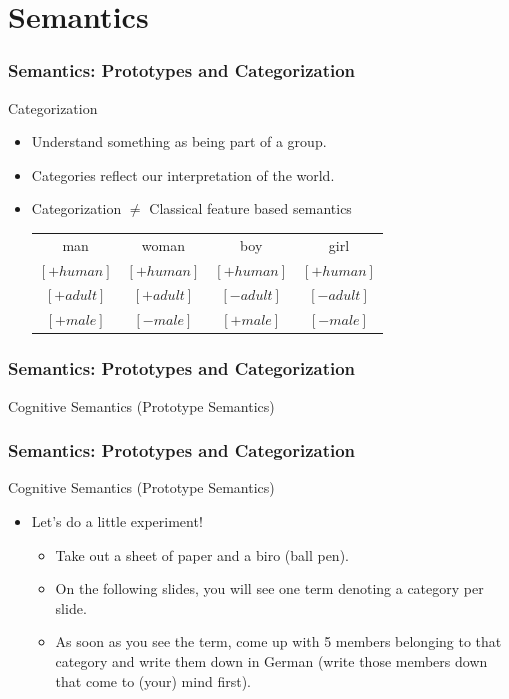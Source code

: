 \documentclass[12pt, table]{beamer}
\begin{document}
\section{Semantics}
\begin{frame}
\frametitle{Semantics: Prototypes and Categorization}
Categorization
\begin{itemize}
\item Understand something as being part of a group.
\item Categories reflect our interpretation of the world.
\item Categorization $\neq$ Classical feature based semantics\\[.5cm]
\begin{tabularx}{\textwidth} {cccc}
man & woman & boy & girl \\
$[+human]$ & $[+human]$ & $[+human]$ & $[+human]$ \\
$[+adult]$ & $[+adult]$ & $[-adult]$ & $[-adult]$ \\
$[+male]$ & $[-male]$ & $[+male]$ & $[-male]$ \\
\end{tabularx}
\end{itemize}
\end{frame}

\begin{frame}
\frametitle{Semantics: Prototypes and Categorization}
Cognitive Semantics (Prototype Semantics)
\end{frame}

\begin{frame}
\frametitle{Semantics: Prototypes and Categorization}
Cognitive Semantics (Prototype Semantics)
\begin{itemize}
\item Let's do a little experiment!
\begin{itemize}
\item Take out a sheet of paper and a biro (ball pen).
\item On the following slides, you will see one term denoting a category per slide.
\item As soon as you see the term, come up with 5 members belonging to that category and write them down in German (write those members down that come to (your) mind first).
\end{itemize}
\end{itemize}
\end{frame}
\end{document}

